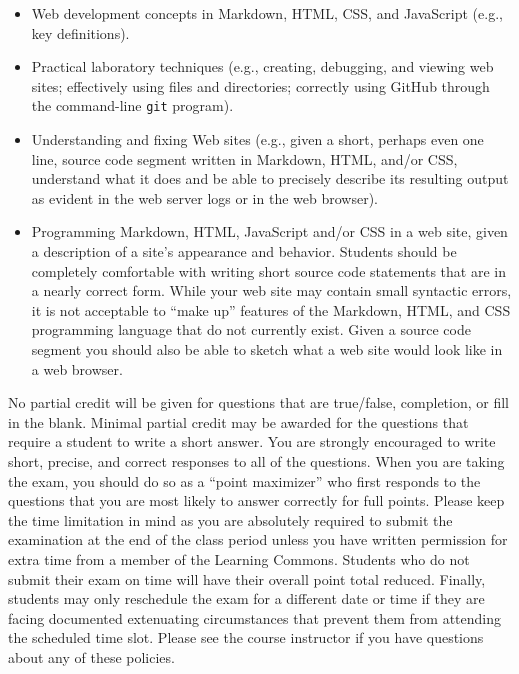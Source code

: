 \documentclass[11pt]{article}
\begin{document}
\vspace*{-.05in}
\begin{itemize}

  \itemsep 0in

  \item Web development concepts in Markdown, HTML, CSS, and JavaScript (e.g.,
    key definitions).

  \item Practical laboratory techniques (e.g., creating, debugging, and viewing
    web sites; effectively using files and directories; correctly using GitHub
    through the command-line {\tt git} program).

  \item Understanding and fixing Web sites (e.g., given a short, perhaps even
    one line, source code segment written in Markdown, HTML, and/or CSS,
    understand what it does and be able to precisely describe its resulting
    output as evident in the web server logs or in the web browser).

  \item Programming Markdown, HTML, JavaScript and/or CSS in a web site, given a
    description of a site's appearance and behavior. Students should be
    completely comfortable with writing short source code statements that are in
    a nearly correct form. While your web site may contain small syntactic
    errors, it is not acceptable to ``make up'' features of the Markdown, HTML,
    and CSS programming language that do not currently exist. Given a source
    code segment you should also be able to sketch what a web site would look
    like in a web browser.

\end{itemize}

\noindent No partial credit will be given for questions that are true/false,
completion, or fill in the blank. Minimal partial credit may be awarded for the
questions that require a student to write a short answer. You are strongly
encouraged to write short, precise, and correct responses to all of the
questions. When you are taking the exam, you should do so as a ``point
maximizer'' who first responds to the questions that you are most likely to
answer correctly for full points. Please keep the time limitation in mind as you
are absolutely required to submit the examination at the end of the class period
unless you have written permission for extra time from a member of the Learning
Commons. Students who do not submit their exam on time will have their overall
point total reduced. Finally, students may only reschedule the exam for a
different date or time if they are facing documented extenuating circumstances
that prevent them from attending the scheduled time slot. Please see the course
instructor if you have questions about any of these policies.
\end{document}
